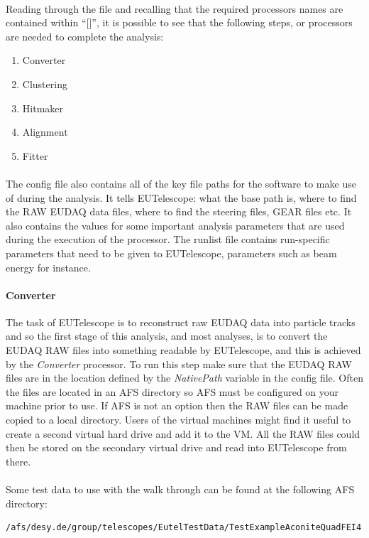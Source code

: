 \documentclass[11pt]{article}
\begin{document}
\paragraph{}
Reading through the file and recalling that the required processors names are contained within ``[]'', it is possible to see that the following steps, or processors are needed to complete the analysis:
\begin{enumerate}
\item Converter
\item Clustering
\item Hitmaker
\item Alignment
\item Fitter
\end{enumerate}
\paragraph{}
The config file also contains all of the key file paths for the software to make use of during the analysis. It tells EUTelescope: what the base path is, where to find the RAW EUDAQ data files, where to find the steering files, GEAR files etc. It also contains the values for some important analysis parameters that are used during the execution of the processor. The runlist file contains run-specific parameters that need to be given to EUTelescope, parameters such as beam energy for instance.
\paragraph{Converter}
The task of EUTelescope is to reconstruct raw EUDAQ data into particle tracks and so the first stage of this analysis, and most analyses, is to convert the EUDAQ RAW files into something readable by EUTelescope, and this is achieved by the \textit{Converter} processor. To run this step make sure that the EUDAQ RAW files are in the location defined by the \textit{NativePath} variable in the config file. Often the files are located in an AFS directory so AFS must be configured on your machine prior to use. If AFS is not an option then the RAW files can be made copied to a local directory. Users of the virtual machines might find it useful to create a second virtual hard drive and add it to the VM. All the RAW files could then be stored on the secondary virtual drive and read into EUTelescope from there.
\paragraph{}
Some test data to use with the walk through can be found at the following AFS directory:
\begin{verbatim}
/afs/desy.de/group/telescopes/EutelTestData/TestExampleAconiteQuadFEI4
\end{verbatim}
\end{document}
